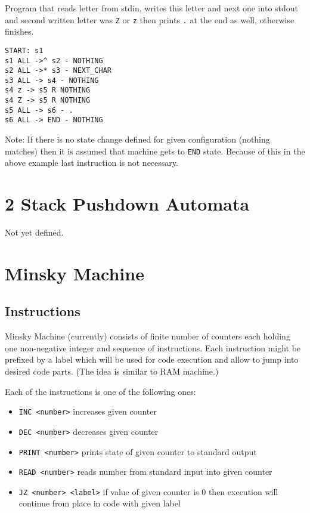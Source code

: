 \documentclass[english,shortabstract,mgr]{iithesis}
\begin{document}
Program that reads letter from stdin, writes this letter and next one into
stdout and second written letter was \texttt{Z} or \texttt{z} then prints
\texttt{.} at the end as well, otherwise finishes.

\begin{verbatim}
START: s1
s1 ALL ->^ s2 - NOTHING
s2 ALL ->* s3 - NEXT_CHAR
s3 ALL -> s4 - NOTHING
s4 z -> s5 R NOTHING
s4 Z -> s5 R NOTHING
s5 ALL -> s6 - .
s6 ALL -> END - NOTHING
\end{verbatim}

Note: If there is no state change defined for given configuration
(nothing matches) then it is assumed that machine gets to \texttt{END} state.
Because of this in the above example last instruction is not necessary.

\section {2 Stack Pushdown Automata}
Not yet defined.

\section {Minsky Machine}

\subsection {Instructions}
Minsky Machine (currently) consists of finite number of counters
each holding one non-negative integer and sequence of instructions.
Each instruction might be prefixed by a label which will be used for
code execution and allow to jump into desired code parts. (The idea is similar
to RAM machine.)

Each of the instructions is one of the following ones:
\begin{itemize}
  \item \texttt{INC <number>} increases given counter
  \item \texttt{DEC <number>} decreases given counter
  \item \texttt{PRINT <number>} prints state of given counter to standard output
  \item \texttt{READ <number>} reads number from standard input into given counter
  \item \texttt{JZ <number> <label>} if value of given counter is 0 then execution
        will continue from place in code with given label
\end{itemize}
\end{document}
